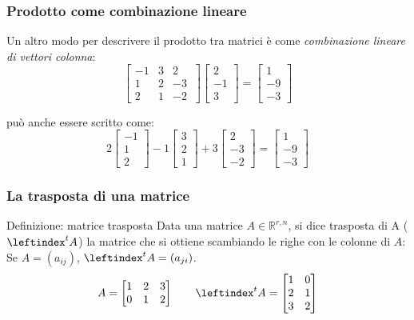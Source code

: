 \documentclass[x11names]{article}
\begin{document}
\subsubsection{Prodotto come combinazione lineare}
Un altro modo per descrivere il prodotto tra matrici è come \textit{combinazione lineare di vettori colonna}:
\[
\begin{bmatrix}
    -1 & 3 & 2 \\
    1 & 2 & -3 \\
    2 & 1 & -2 \
\end{bmatrix}
\begin{bmatrix}
2 \\ -1 \\ 3
\end{bmatrix}
=
\begin{bmatrix}
1 \\ -9  \\ -3
\end{bmatrix}
\] 

può anche essere scritto come:
\[
2 \begin{bmatrix}
-1 \\ 1 \\ 2
\end{bmatrix}
-1
\begin{bmatrix}
3 \\ 2   \\ 1 
\end{bmatrix}
+3
\begin{bmatrix}
2 \\ -3  \\ -2 
\end{bmatrix}
= 
\begin{bmatrix}
1 \\-9  \\-3 
\end{bmatrix}
\] 

\subsubsection{La trasposta di una matrice}
\begin{center}
\colorbox{myblue}{\begin{minipage}{5.75in}
\begin{blues}{Definizione: matrice trasposta}
    Data una matrice $A \in \mathbb{R}^{r,n}$, si dice trasposta di A ($\leftindex^t{A}$) la matrice che si ottiene scambiando le righe con le colonne di $A$: Se $A = (a_{ij})$, $\leftindex^t{A} = (a_{ji})$.
$$
    A = \begin{bmatrix}
        1 & 2 & 3 \\
        0 & 1 & 2 
    \end{bmatrix}
    \qquad
    \leftindex^t{A} = \begin{bmatrix}
        1 & 0 \\
        2 & 1 \\
        3 & 2
    \end{bmatrix}
$$

\end{blues}
\end{minipage}}        
\end{center}
\end{document}
